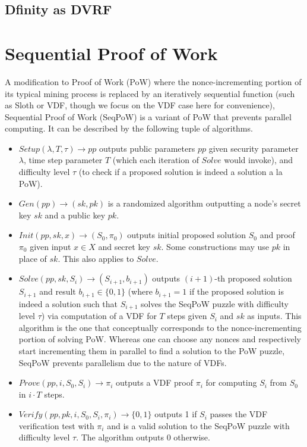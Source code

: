\documentclass[letterpaper,twocolumn,10pt]{article}
\theoremstyle{definition}
\theoremstyle{remark}
\begin{document}
\subsection{Dfinity as DVRF}

\section{Sequential Proof of Work}
A modification to Proof of Work (PoW) where the nonce-incrementing portion of its typical mining process is replaced by an iteratively sequential function (such as Sloth \cite{lenstra2015random} or VDF, though we focus on the VDF case here for convenience), Sequential Proof of Work (SeqPoW) \cite{han2020randchain} is a variant of PoW that prevents parallel computing. It can be described by the following tuple of algorithms.
\begin{itemize}
\item $Setup(\lambda, T, \tau) \rightarrow pp$ outputs public parameters $pp$ given security parameter $\lambda$, time step parameter $T$ (which each iteration of $Solve$ would invoke), and difficulty level $\tau$ (to check if a proposed solution is indeed a solution a la PoW).
\item $Gen(pp) \rightarrow (sk, pk)$ is a randomized algorithm outputting a node's secret key $sk$ and a public key $pk$.
\item $Init(pp, sk, x) \rightarrow (S_0, \pi_0)$ outputs initial proposed solution $S_0$ and proof $\pi_0$ given input $x \in X$ and secret key $sk$. Some constructions may use $pk$ in place of $sk$. This also applies to $Solve$.
\item $Solve(pp, sk, S_i) \rightarrow (S_{i + 1}, b_{i + 1})$ outputs $(i + 1)$-th proposed solution $S_{i + 1}$ and result $b_{i + 1} \in \{0, 1\}$ (where $b_{i + 1} = 1$ if the proposed solution is indeed a solution such that $S_{i + 1}$ solves the SeqPoW puzzle with difficulty level $\tau$) via computation of a VDF for $T$ steps given $S_i$ and $sk$ as inputs. This algorithm is the one that conceptually corresponds to the nonce-incrementing portion of solving PoW. Whereas one can choose any nonces and respectively start incrementing them in parallel to find a solution to the PoW puzzle, SeqPoW prevents parallelism due to the nature of VDFs.
\item $Prove(pp, i, S_0, S_i) \rightarrow \pi_i$ outputs a VDF proof $\pi_i$ for computing $S_i$ from $S_0$ in $i \cdot T$ steps.
\item $Verify(pp, pk, i, S_0, S_i, \pi_i) \rightarrow \{0, 1\}$ outputs 1 if $S_i$ passes the VDF verification test with $\pi_i$ and is a valid solution to the SeqPoW puzzle with difficulty level $\tau$. The algorithm outputs 0 otherwise.
\end{itemize}
\end{document}
